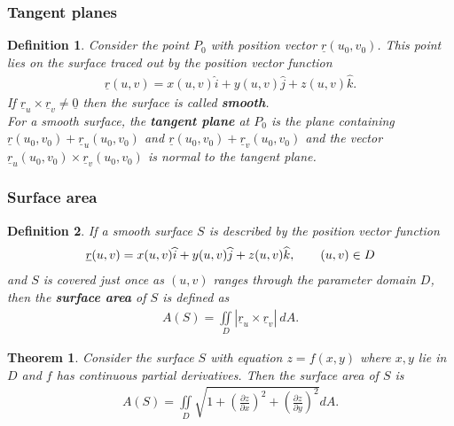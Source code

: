 \documentclass{article}
\theoremstyle{sltheorem}
\newtheorem{definition}{Definition}[section]
\newtheorem{theorem}{Theorem}[section]
\newcommand{\ih}{\widehat i}
\newcommand{\jh}{\widehat j}
\newcommand{\kh}{\widehat k}
\newcommand{\di}{\iint\limits}
\newcommand{\hs}{\hspace{0.7cm}}
\renewcommand{\vec}{\underline}
\newcommand*\B[1]{\textbf{#1}}
\begin{document}
\subsubsection{Tangent planes}
\begin{definition}
    Consider the point $P_0$ with position vector $\vec r(u_0, v_0)$. This point lies
    on the surface traced out by the position vector function
    \begin{align*}
        \vec r(u,v) = x(u,v)\ih + y(u,v)\jh + z(u,v)\kh.
    \end{align*}
    If $\vec r_u \times\vec r_v\not=\vec 0$ then the surface is called \B{smooth}.\\
     For a smooth surface, the \B{tangent plane} at $P_0$ is the plane containing
              $\vec r(u_0,v_0)+\vec r_u(u_0,v_0)$ and $\vec r(u_0,v_0)+\vec r_v(u_0,v_0)$ and the vector
              $\vec r_u(u_0,v_0)\times \vec r_v(u_0,v_0)$ is normal to the tangent plane.

\end{definition}
\subsubsection{Surface area}
\begin{definition}
    If a smooth surface $S$ is described by the position vector function
    \begin{align*}
        \vec r(u,v) = x(u,v)\ih + y(u,v)\jh + z(u,v)\kh,\hs (u,v)\in D
    \end{align*}
    and $S$ is covered just once as $(u,v)$ ranges through the parameter domain $D$,
    then the \B{surface area} of $S$ is defined as
    \begin{align*}
        A(S)=\di_D |\vec r_u \times \vec r_v|\:dA.
    \end{align*}
\end{definition}
\begin{theorem}
    Consider the surface $S$ with equation $z=f(x,y)$ where $x,y$ lie in $D$ and $f$
    has continuous partial derivatives. Then the surface area of $S$ is
    \begin{align*}
        A(S) = \di_D \sqrt{1+\left(\frac{\partial z}{\partial x}\right)^2 + \left(\frac{\partial z}{\partial y}\right)^2}dA.
    \end{align*}
\end{theorem}
\end{document}
